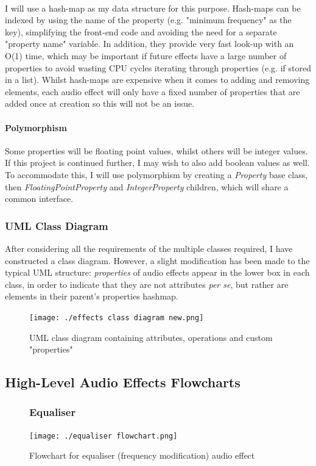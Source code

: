 \paragraph{}
I will use a hash-map as my data structure for this purpose. Hash-maps can be indexed by using the name of the property (e.g. "minimum frequency" as the key), simplifying the front-end code and avoiding the need for a separate "property name" variable. In addition, they provide very fast look-up with an O(1) time, which may be important if future effects have a large number of properties to avoid wasting CPU cycles iterating through properties (e.g. if stored in a list). Whilst hash-maps are expensive when it comes to adding and removing elements, each audio effect will only have a fixed number of properties that are added once at creation so this will not be an issue.

\paragraph{Polymorphism}
Some properties will be floating point values, whilst others will be integer values. If this project is continued further, I may wish to also add boolean values as well. To accommodate this, I will use polymorphism by creating a \textit{Property} base class, then \textit{FloatingPointProperty} and \textit{IntegerProperty}  children, which will share a common interface.

\subsubsection{UML Class Diagram}
After considering all the requirements of the multiple classes required, I have constructed a class diagram. However, a slight modification has been made to the typical UML structure: \textit{properties} of audio effects appear in the lower box in each class, in order to indicate that they are not attributes {\it per se}, but rather are elements in their parent's properties hashmap.

\begin{figure}[h]
	\texttt{[image: ./effects class diagram new.png]}
	\caption{UML class diagram containing attributes, operations and custom "properties"}
\end{figure}

\pagebreak

\subsection{High-Level Audio Effects Flowcharts}
\begin{figure}[H]
	\subsubsection{Equaliser}
	\texttt{[image: ./equaliser flowchart.png]}
	\caption{Flowchart for equaliser (frequency modification) audio effect}
\end{figure}

